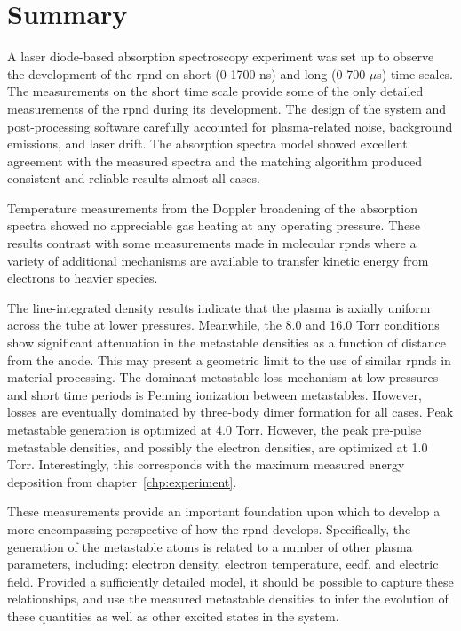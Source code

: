 \section{Summary}
A laser diode-based absorption spectroscopy experiment was set up to observe the
development of the \acs{rpnd} on short (0-1700 ns) and long (0-700 $\mu$s) time
scales. The measurements on the short time scale provide some of the only
detailed measurements of the \acs{rpnd} during its development. The design of
the system and post-processing software carefully accounted for plasma-related
noise, background emissions, and laser drift. The absorption spectra model
showed excellent agreement with the measured spectra and the matching algorithm
produced consistent and reliable results almost all cases.

Temperature measurements from the Doppler broadening of the absorption spectra
showed no appreciable gas heating at any operating pressure. These results
contrast with some measurements made in molecular \acs{rpnd}s where a variety of
additional mechanisms are available to transfer kinetic energy from electrons to
heavier species.

The line-integrated density results indicate that the plasma is axially uniform
across the tube at lower pressures. Meanwhile, the 8.0 and 16.0 Torr conditions
show significant attenuation in the metastable densities as a function of
distance from the anode. This may present a geometric limit to the use of
similar \acs{rpnd}s in material processing. The dominant metastable loss
mechanism at low pressures and short time periods is Penning ionization between
metastables. However, losses are eventually dominated by three-body dimer
formation for all cases. Peak metastable generation is optimized at 4.0 Torr.
However, the peak pre-pulse metastable densities, and possibly the electron
densities, are optimized at 1.0 Torr. Interestingly, this corresponds with the
maximum measured energy deposition from chapter~\ref{chp:experiment}.

These measurements provide an important foundation upon which to develop a more
encompassing perspective of how the \acs{rpnd} develops. Specifically, the
generation of the metastable atoms is related to a number of other plasma
parameters, including: electron density, electron temperature, \acs{eedf}, and
electric field. Provided a sufficiently detailed model, it should be possible to
capture these relationships, and use the measured metastable densities to infer
the evolution of these quantities as well as other excited states in the system.
